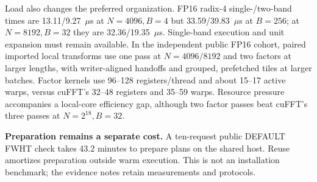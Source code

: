 Load also changes the preferred organization. FP16 radix-4 single-/two-band
times are 13.11/9.27~$\mu$s at $N=4096,B=4$ but 33.59/39.83~$\mu$s
at $B=256$; at $N=8192,B=32$ they are 32.36/19.35~$\mu$s.
Single-band execution and unit expansion must remain available.
In the independent public FP16 cohort, paired imported local transforms
use one pass at $N=4096/8192$ and two factors at larger lengths, with
writer-aligned handoffs and grouped, prefetched tiles at larger batches.
Factor kernels use 96--128 registers/thread and about 15--17 active warps,
versus cuFFT's 32--48 registers and 35--59 warps. Resource pressure accompanies
a local-core efficiency gap, although two factor passes beat cuFFT's three
passes at $N=2^{18},B=32$.

\textbf{Preparation remains a separate cost.}
A ten-request public DEFAULT FWHT check takes 43.2 minutes to prepare plans
on the shared host. Reuse amortizes preparation outside warm execution. This is not an installation
benchmark; the evidence notes retain measurements and protocols.
